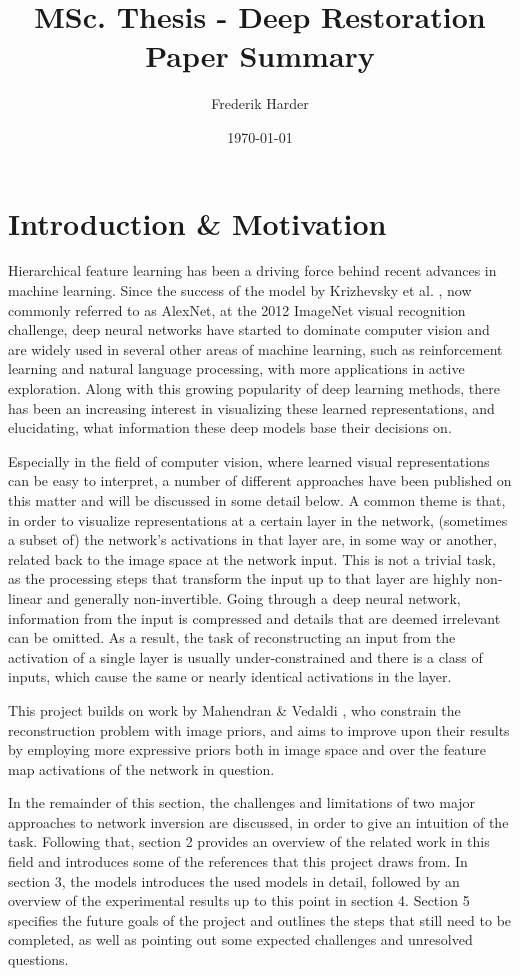 \documentclass{article}
\title{MSc. Thesis - Deep Restoration\\Paper Summary}
\date{\today}
\author{Frederik Harder}
\begin{document}
\maketitle

\section{Introduction \& Motivation}


Hierarchical feature learning has been a driving force behind recent advances in machine learning. Since the success of the model by Krizhevsky et al. \cite{alexnet}, now commonly referred to as AlexNet, at the 2012 ImageNet visual recognition challenge, deep neural networks have started to dominate computer vision and are widely used in several other areas of machine learning, such as reinforcement learning and natural language processing, with more applications in active exploration. Along with this growing popularity of deep learning methods, there has been an increasing interest in visualizing these learned representations, and elucidating, what information these deep models base their decisions on. 

Especially in the field of computer vision, where learned visual representations can be easy to interpret, a number of different approaches have been published on this matter and will be discussed in some detail below. A common theme is that, in order to visualize representations at a certain layer in the network, (sometimes a subset of) the network's activations in that layer are, in some way or another, related back to the image space at the network input. This is not a trivial task, as the processing steps that transform the input up to that layer are highly non-linear and generally non-invertible. Going through a deep neural network, information from the input is compressed and details that are deemed irrelevant can be omitted. As a result, the task of reconstructing an input from the activation of a single layer is usually under-constrained and there is a class of inputs, which cause the same or nearly identical activations in the layer.

This project builds on work by Mahendran \& Vedaldi \cite{mv15, mv16}, who constrain the reconstruction problem with image priors, and aims to improve upon their results by employing more expressive priors both in image space and over the feature map activations of the network in question.

In the remainder of this section, the challenges and limitations of two major approaches to network inversion are discussed, in order to give an intuition of the task. Following that, section 2 provides an overview of the related work in this field and introduces some of the references that this project draws from. In section 3, the models introduces the used models in detail, followed by an overview of the experimental results up to this point in section 4. Section 5 specifies the future goals of the project and outlines the steps that still need to be completed, as well as pointing out some expected challenges and unresolved questions.
\end{document}

